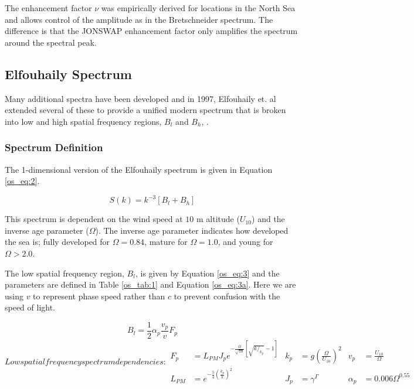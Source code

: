 The enhancement factor $\nu$ was empirically derived for locations in the North Sea and allows control of the amplitude as in the Bretschneider spectrum. The difference is that the JONSWAP enhancement factor only amplifies the spectrum around the spectral peak.

\subsection {Elfouhaily Spectrum}
Many additional spectra have been developed and in 1997, Elfouhaily et. al extended several of these to provide a unified modern spectrum that is broken into low and high spatial frequency regions, $B_l$ and $B_h$, \cite{elfouhaily}. 

\subsubsection {Spectrum Definition}
The 1-dimensional version of the Elfouhaily spectrum is given in Equation \ref{os_eq:2}.

\begin{equation}
  \label{os_eq:2}
  S(k) = k^{-3}\left[B_l + B_h \right]
\end{equation}
\renewcommand{\baselinestretch}{2} \small\normalsize

This spectrum is dependent on the wind speed at $10$ m altitude ($U_{10}$) and the inverse age parameter ($\Omega$). The inverse age parameter indicates how developed the sea is; fully developed for $\Omega = 0.84$, mature for $\Omega = 1.0$, and young for $\Omega > 2.0$. 

The low spatial frequency region, $B_l$, is given by Equation \ref{os_eq:3} and the parameters are defined in Table \ref{os_tab:1} and Equation \ref{os_eq:3a}. Here we are using $v$ to represent phase speed rather than $c$ to prevent confusion with the speed of light.

\begin{equation}
  \label{os_eq:3}
 B_l = \frac{1}{2} \alpha_p \frac{v_p}{v} F_p
\end{equation}
\renewcommand{\baselinestretch}{2} \small\normalsize
\begin{subequations}
\label{os_eq:3a}
   Low spatial frequency spectrum dependencies:
\begin{align}
  F_p &= L_{PM}J_pe^{-\frac{\Omega}{\sqrt{10}}\left[\sqrt{k/_{k_p}} - 1 \right]} &  k_p &= g\left(\frac{\Omega}{U_{10}}\right)^2 & v_p &= \frac{U_{10}}{\Omega} \\
   L_{PM} &=e^{-\frac{5}{4}\left(\frac{k_p}{k} \right)^2} &  J_p &= \gamma^\Gamma  & \alpha_p &= 0.006\Omega^{0.55} 
\end{align}
\end{subequations}
\renewcommand{\baselinestretch}{2} \small\normalsize

